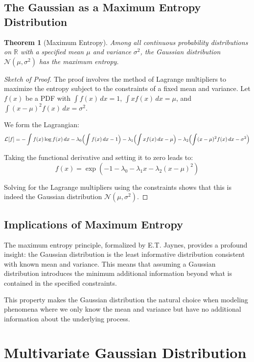 \documentclass{article}
\newtheorem{theorem}{Theorem}
\begin{document}
\subsection{The Gaussian as a Maximum Entropy Distribution}

\begin{theorem}[Maximum Entropy]
Among all continuous probability distributions on $\mathbb{R}$ with a specified mean $\mu$ and variance $\sigma^2$, the Gaussian distribution $\mathcal{N}(\mu, \sigma^2)$ has the maximum entropy.
\end{theorem}

\begin{proof}[Sketch of Proof]
The proof involves the method of Lagrange multipliers to maximize the entropy subject to the constraints of a fixed mean and variance. Let $f(x)$ be a PDF with $\int f(x) \, dx = 1$, $\int x f(x) \, dx = \mu$, and $\int (x-\mu)^2 f(x) \, dx = \sigma^2$. 

We form the Lagrangian:
\[
\mathcal{L}[f] = -\int f(x) \log f(x) \, dx - \lambda_0 \Bigl(\int f(x) \, dx - 1\Bigr) - \lambda_1 \Bigl(\int x f(x) \, dx - \mu\Bigr) - \lambda_2 \Bigl(\int (x-\mu)^2 f(x) \, dx - \sigma^2\Bigr)
\]

Taking the functional derivative and setting it to zero leads to:
\[
f(x) = \exp(-1-\lambda_0-\lambda_1 x-\lambda_2(x-\mu)^2)
\]

Solving for the Lagrange multipliers using the constraints shows that this is indeed the Gaussian distribution $\mathcal{N}(\mu, \sigma^2)$.
\end{proof}

\subsection{Implications of Maximum Entropy}

The maximum entropy principle, formalized by E.T. Jaynes, provides a profound insight: the Gaussian distribution is the least informative distribution consistent with known mean and variance. This means that assuming a Gaussian distribution introduces the minimum additional information beyond what is contained in the specified constraints.

This property makes the Gaussian distribution the natural choice when modeling phenomena where we only know the mean and variance but have no additional information about the underlying process.

\section{Multivariate Gaussian Distribution}
\end{document}
